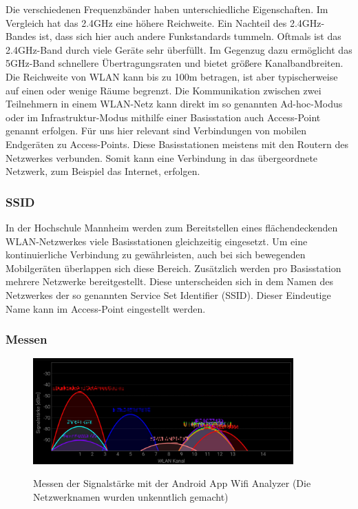 \documentclass{scrartcl}%
\begin{document}
Die verschiedenen Frequenzbänder haben unterschiedliche Eigenschaften. Im Vergleich hat das 2.4GHz eine höhere Reichweite. Ein Nachteil des 2.4GHz-Bandes ist, dass sich hier auch andere Funkstandards tummeln. Oftmals ist das 2.4GHz-Band durch viele Geräte sehr überfüllt. Im Gegenzug dazu ermöglicht das 5GHz-Band schnellere Übertragungsraten und bietet größere Kanalbandbreiten. Die Reichweite von WLAN kann bis zu 100m betragen, ist aber typischerweise auf einen oder wenige Räume begrenzt. 
Die Kommunikation zwischen zwei Teilnehmern in einem WLAN-Netz kann direkt im so genannten Ad-hoc-Modus oder im Infrastruktur-Modus mithilfe einer Basisstation auch Access-Point genannt erfolgen. Für uns hier relevant sind Verbindungen von mobilen Endgeräten zu Access-Points. Diese Basisstationen meistens mit den Routern des Netzwerkes verbunden. Somit kann eine Verbindung in das übergeordnete Netzwerk, zum Beispiel das Internet, erfolgen.

\subsubsection{SSID}
In der Hochschule Mannheim werden zum Bereitstellen eines flächendeckenden WLAN-Netzwerkes viele Basisstationen gleichzeitig eingesetzt. Um eine kontinuierliche Verbindung zu gewährleisten, auch bei sich bewegenden Mobilgeräten überlappen sich diese Bereich. 
Zusätzlich werden pro Basisstation mehrere Netzwerke bereitgestellt. Diese unterscheiden sich in dem Namen des Netzwerkes der so genannten Service Set Identifier (SSID). Dieser Eindeutige Name kann im Access-Point eingestellt werden. 

\subsubsection{Messen}

\begin{figure}[h]
	\centering
	\caption{Messen der Signalstärke mit der Android App Wifi Analyzer (Die Netzwerknamen wurden unkenntlich gemacht)}
	\includegraphics[width=10cm]{bilder/wifianalyzer}
	\newline
	\label{wifiAnalyzer}
\end{figure}
\end{document}
